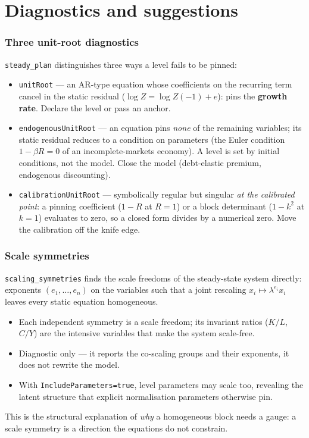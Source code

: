 \documentclass[10pt,slidestop]{beamer}
\newcommand{\code}[1]{\texttt{#1}}
\begin{document}
\section{Diagnostics and suggestions}

\begin{frame}\frametitle{Three unit-root diagnostics}
  \code{steady\_plan} distinguishes three ways a level fails to be pinned:

  \begin{itemize}\small
  \item \code{unitRoot} --- an AR-type equation whose coefficients on the
    recurring term cancel in the static residual ($\log Z = \log Z(-1) + e$):
    pins the \textbf{growth rate}. Declare the level or pass an anchor.\newline
  \item \code{endogenousUnitRoot} --- an equation pins \emph{none} of the
    remaining variables; its static residual reduces to a condition on parameters
    (the Euler condition $1 - \beta R = 0$ of an incomplete-markets economy). A
    level is set by initial conditions, not the model. Close the model
    (debt-elastic premium, endogenous discounting).\newline
  \item \code{calibrationUnitRoot} --- symbolically regular but singular
    \emph{at the calibrated point}: a pinning coefficient ($1-R$ at $R=1$) or a
    block determinant ($1-k^2$ at $k=1$) evaluates to zero, so a closed form
    divides by a numerical zero. Move the calibration off the knife edge.
  \end{itemize}
\end{frame}

\begin{frame}\frametitle{Scale symmetries}
  \code{scaling\_symmetries} finds the scale freedoms of the steady-state system
  directly: exponents $(e_1,\dots,e_n)$ on the variables such that a joint
  rescaling $x_i \mapsto \lambda^{e_i} x_i$ leaves every static equation
  homogeneous.

  \begin{itemize}
  \item Each independent symmetry is a scale freedom; its invariant ratios
    ($K/L$, $C/Y$) are the intensive variables that make the system scale-free.\newline
  \item Diagnostic only --- it reports the co-scaling groups and their exponents,
    it does not rewrite the model.\newline
  \item With \code{IncludeParameters=true}, level parameters may scale too,
    revealing the latent structure that explicit normalisation parameters
    otherwise pin.
  \end{itemize}

  \smallskip
  This is the structural explanation of \emph{why} a homogeneous block needs a
  gauge: a scale symmetry is a direction the equations do not constrain.
\end{frame}
\end{document}
